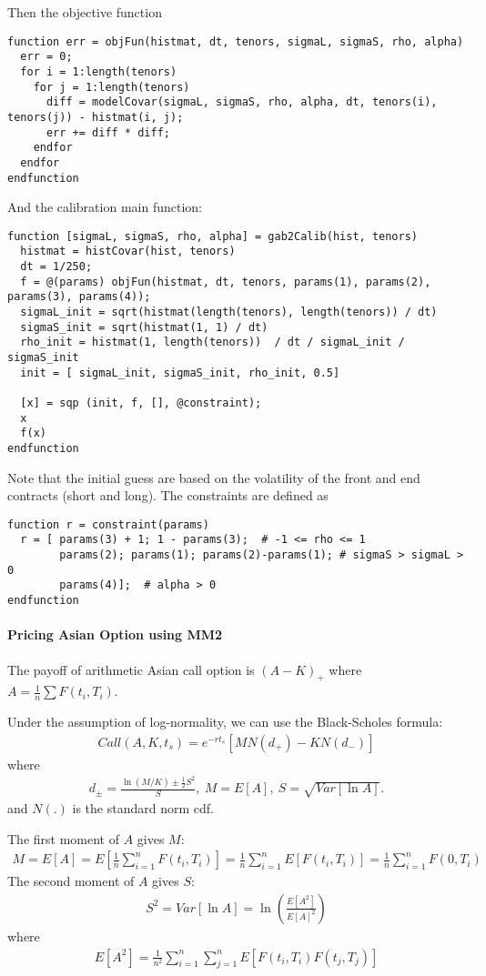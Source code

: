 \documentclass[12pt,a4paper,hidelinks,fleqn]{article}            %
\begin{document}
Then the objective function 
\begin{verbatim}
function err = objFun(histmat, dt, tenors, sigmaL, sigmaS, rho, alpha)
  err = 0;
  for i = 1:length(tenors)
    for j = 1:length(tenors)
      diff = modelCovar(sigmaL, sigmaS, rho, alpha, dt, tenors(i), tenors(j)) - histmat(i, j);
      err += diff * diff;
    endfor
  endfor
endfunction
\end{verbatim}
And the calibration main function:
\begin{verbatim}
function [sigmaL, sigmaS, rho, alpha] = gab2Calib(hist, tenors)
  histmat = histCovar(hist, tenors)
  dt = 1/250;
  f = @(params) objFun(histmat, dt, tenors, params(1), params(2), params(3), params(4));
  sigmaL_init = sqrt(histmat(length(tenors), length(tenors)) / dt)
  sigmaS_init = sqrt(histmat(1, 1) / dt)
  rho_init = histmat(1, length(tenors))  / dt / sigmaL_init / sigmaS_init
  init = [ sigmaL_init, sigmaS_init, rho_init, 0.5]

  [x] = sqp (init, f, [], @constraint);
  x
  f(x)
endfunction
\end{verbatim}
Note that the initial guess are based on the volatility of the front and end contracts (short and long).
The constraints are defined as
\begin{verbatim}
function r = constraint(params)
  r = [ params(3) + 1; 1 - params(3);  # -1 <= rho <= 1
        params(2); params(1); params(2)-params(1); # sigmaS > sigmaL > 0
        params(4)];  # alpha > 0
endfunction
\end{verbatim}

\paragraph{Pricing Asian Option using MM2}
The payoff of arithmetic Asian call option is $(A - K)_+$ where $A = \frac{1}{n}\sum F(t_i, T_i)$.  

Under the assumption of log-normality, we can use the Black-Scholes formula:
\begin{align*}
Call(A, K, t_s) = e^{-rt_s}[M N(d_+) - KN(d_-)]
\end{align*}
where
\begin{align*}
d_{\pm} = \frac{\ln (M/K) \pm \frac{1}{2}S^2}{S}, 
~M = E[A], ~S=\sqrt{Var[\ln A]}.
\end{align*}
and $N(.)$ is the standard norm cdf.

The first moment of $A$ gives $M$:
\begin{align*}
M = E[A] = E[\frac{1}{n}\sum_{i=1}^n F(t_i, T_i)] = \frac{1}{n}\sum_{i=1}^n E[F(t_i, T_i)] = \frac{1}{n} \sum_{i=1}^n F(0, T_i)
\end{align*}
The second moment of $A$ gives $S$:
\begin{align*}
S^2 = Var[\ln A] = \ln \left( \frac{E[A^2]}{E[A]^2} \right)
\end{align*}
where
\begin{align}
E[A^2] = \frac{1}{n^2}\sum_{i=1}^n \sum_{j=1}^n E[F(t_i, T_i) F(t_j, T_j)] 
\label{eq:sec-moment}
\end{align}
\end{document}
